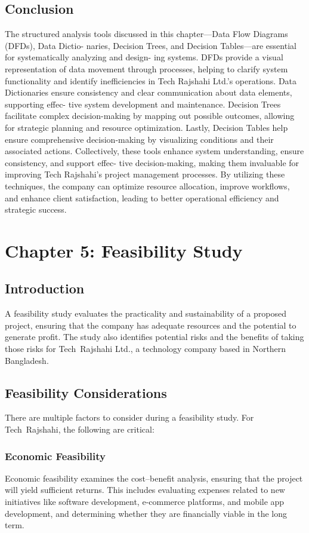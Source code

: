 \documentclass[12pt,a4paper]{article}
\begin{document}
\subsection{Conclusion}
The structured analysis tools discussed in this chapter—Data Flow Diagrams (DFDs), Data Dictio-
naries, Decision Trees, and Decision Tables—are essential for systematically analyzing and design-
ing systems. DFDs provide a visual representation of data movement through processes, helping
to clarify system functionality and identify inefficiencies in Tech Rajshahi Ltd.’s operations. Data
Dictionaries ensure consistency and clear communication about data elements, supporting effec-
tive system development and maintenance. Decision Trees facilitate complex decision-making by
mapping out possible outcomes, allowing for strategic planning and resource optimization. Lastly,
Decision Tables help ensure comprehensive decision-making by visualizing conditions and their
associated actions.
Collectively, these tools enhance system understanding, ensure consistency, and support effec-
tive decision-making, making them invaluable for improving Tech Rajshahi’s project management
processes. By utilizing these techniques, the company can optimize resource allocation, improve
workflows, and enhance client satisfaction, leading to better operational efficiency and strategic
success.

\section{Chapter 5: Feasibility Study}

\subsection{Introduction}
A feasibility study evaluates the practicality and sustainability of a proposed project, ensuring that the company has adequate resources and the potential to generate profit.  The study also identifies potential risks and the benefits of taking those risks for Tech Rajshahi Ltd., a technology company based in Northern Bangladesh.

\subsection{Feasibility Considerations}
There are multiple factors to consider during a feasibility study.  For Tech Rajshahi, the following are critical:

\subsubsection{Economic Feasibility}
Economic feasibility examines the cost–benefit analysis, ensuring that the project will yield sufficient returns.  This includes evaluating expenses related to new initiatives like software development, e‑commerce platforms, and mobile app development, and determining whether they are financially viable in the long term.
\end{document}
